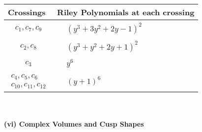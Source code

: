 \documentclass[1p]{elsarticle_modified}
\theoremstyle{definition}
\begin{document}
\begin{tabular}{m{50pt}|m{274pt}}
Crossings & \hspace{64pt}Riley Polynomials at each crossing \\
\hline $$\begin{aligned}c_{1},c_{7},c_{9}\end{aligned}$$&$\begin{aligned}
&(y^3+3 y^2+2 y-1)^2
\end{aligned}$\\
\hline $$\begin{aligned}c_{2},c_{8}\end{aligned}$$&$\begin{aligned}
&(y^3+y^2+2 y+1)^2
\end{aligned}$\\
\hline $$\begin{aligned}c_{3}\end{aligned}$$&$\begin{aligned}
&y^6
\end{aligned}$\\
\hline $$\begin{aligned}c_{4},c_{5},c_{6}\\c_{10},c_{11},c_{12}\end{aligned}$$&$\begin{aligned}
&(y+1)^6
\end{aligned}$\\
\hline
\end{tabular}\\~\\
\newpage\flushleft \textbf{(vi) Complex Volumes and Cusp Shapes}
\end{document}
